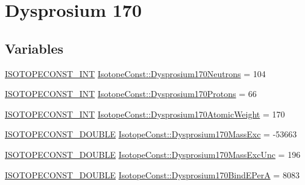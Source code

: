 \hypertarget{group___isotope_const-_dysprosium-_dy170}{}\section{Dysprosium 170}
\label{group___isotope_const-_dysprosium-_dy170}
\subsection*{Variables}
\begin{DoxyCompactItemize}
\item 
\mbox{\hyperlink{group___isotope_const-_macros_ga5f18360b3e99483a35c32d789e62621c}{I\+S\+O\+T\+O\+P\+E\+C\+O\+N\+S\+T\+\_\+\+I\+NT}} \mbox{\hyperlink{group___isotope_const-_dysprosium-_dy170_ga509a31c264b41833175a6523d89b4973}{Isotope\+Const\+::\+Dysprosium170\+Neutrons}} = 104
\item 
\mbox{\hyperlink{group___isotope_const-_macros_ga5f18360b3e99483a35c32d789e62621c}{I\+S\+O\+T\+O\+P\+E\+C\+O\+N\+S\+T\+\_\+\+I\+NT}} \mbox{\hyperlink{group___isotope_const-_dysprosium-_dy170_ga271c3ad471554c78dad1ad96811b4b42}{Isotope\+Const\+::\+Dysprosium170\+Protons}} = 66
\item 
\mbox{\hyperlink{group___isotope_const-_macros_ga5f18360b3e99483a35c32d789e62621c}{I\+S\+O\+T\+O\+P\+E\+C\+O\+N\+S\+T\+\_\+\+I\+NT}} \mbox{\hyperlink{group___isotope_const-_dysprosium-_dy170_ga230849b991b7397fa33c382f6b440681}{Isotope\+Const\+::\+Dysprosium170\+Atomic\+Weight}} = 170
\item 
\mbox{\hyperlink{group___isotope_const-_macros_ga8f45a7272ce02c0b4c65c44636ed719a}{I\+S\+O\+T\+O\+P\+E\+C\+O\+N\+S\+T\+\_\+\+D\+O\+U\+B\+LE}} \mbox{\hyperlink{group___isotope_const-_dysprosium-_dy170_gab721acfc5f22f446b3e32f6b2bb8ffff}{Isotope\+Const\+::\+Dysprosium170\+Mass\+Exc}} = -\/53663
\item 
\mbox{\hyperlink{group___isotope_const-_macros_ga8f45a7272ce02c0b4c65c44636ed719a}{I\+S\+O\+T\+O\+P\+E\+C\+O\+N\+S\+T\+\_\+\+D\+O\+U\+B\+LE}} \mbox{\hyperlink{group___isotope_const-_dysprosium-_dy170_gaf032bb549fbe7eb13958527d07e1b4d7}{Isotope\+Const\+::\+Dysprosium170\+Mass\+Exc\+Unc}} = 196
\item 
\mbox{\hyperlink{group___isotope_const-_macros_ga8f45a7272ce02c0b4c65c44636ed719a}{I\+S\+O\+T\+O\+P\+E\+C\+O\+N\+S\+T\+\_\+\+D\+O\+U\+B\+LE}} \mbox{\hyperlink{group___isotope_const-_dysprosium-_dy170_ga7d41233f3eaeb52506e865a0093f6663}{Isotope\+Const\+::\+Dysprosium170\+Bind\+E\+PerA}} = 8083
\item 

\end{DoxyCompactItemize}
